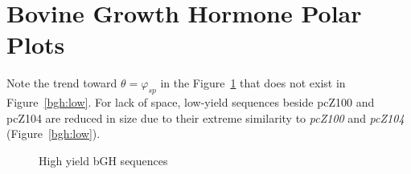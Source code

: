 \documentclass[10pt,twocolumn]{article}
\begin{document}


\onecolumn
\appendix
\section{Bovine Growth Hormone Polar Plots}

Note the trend toward $\theta = \varphi_{sp}$ in the Figure~\ref{bgh:high} that does
not exist in Figure~\ref{bgh:low}. For lack of space, low-yield sequences beside pcZ100 and pcZ104
are reduced in size due to their extreme similarity to \emph{pcZ100} and \emph{pcZ104} (Figure~\ref{bgh:low}).

\begin{figure}[htp]
    \centering
    \caption{High yield bGH sequences}
    \label{bgh:high}
\end{figure}
\end{document}
